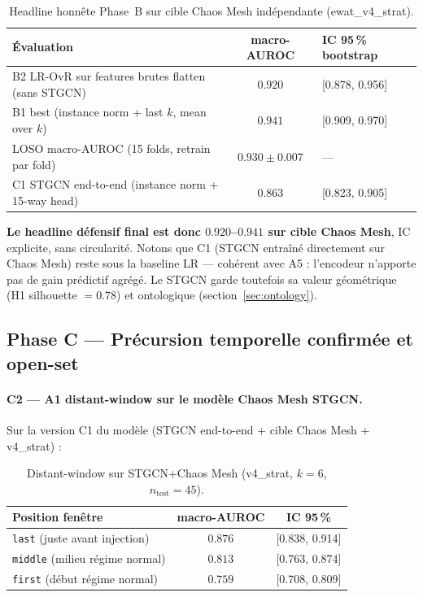 \begin{table}[h]
\centering
\caption{Headline honnête Phase~B sur cible Chaos Mesh indépendante (ewat\_v4\_strat).}
\label{tab:archv2_headline}
\begin{tabular}{lcl}
\toprule
\textbf{Évaluation} & \textbf{macro-AUROC} & \textbf{IC 95\,\% bootstrap} \\
\midrule
B2 LR-OvR sur features brutes flatten (sans STGCN) & $\mathbf{0.920}$ & [0.878, 0.956] \\
B1 best (instance norm + last $k$, mean over $k$)  & $\mathbf{0.941}$ & [0.909, 0.970] \\
LOSO macro-AUROC (15 folds, retrain par fold)      & $0.930 \pm 0.007$ & --- \\
C1 STGCN end-to-end (instance norm + 15-way head)  & $0.863$ & [0.823, 0.905] \\
\bottomrule
\end{tabular}
\end{table}

\textbf{Le headline défensif final est donc $0.920$--$0.941$ sur cible Chaos Mesh}, IC explicite,
sans circularité. Notons que C1 (STGCN entraîné directement sur Chaos Mesh) reste sous la baseline
LR --- cohérent avec A5 : l'encodeur n'apporte pas de gain prédictif agrégé.
Le STGCN garde toutefois sa valeur géométrique (H1 silhouette $= 0.78$) et
ontologique (section~\ref{sec:ontology}).

\subsection{Phase C --- Précursion temporelle confirmée et open-set}

\paragraph{C2 --- A1 distant-window sur le modèle Chaos Mesh STGCN.}
Sur la version C1 du modèle (STGCN end-to-end + cible Chaos Mesh + v4\_strat) :

\begin{table}[h]
\centering
\caption{Distant-window sur STGCN+Chaos Mesh (v4\_strat, $k=6$, $n_{\text{test}}=45$).}
\label{tab:c2_distant}
\begin{tabular}{lcc}
\toprule
\textbf{Position fenêtre} & \textbf{macro-AUROC} & \textbf{IC 95\,\%} \\
\midrule
\texttt{last} (juste avant injection) & $\mathbf{0.876}$ & [0.838, 0.914] \\
\texttt{middle} (milieu régime normal) & $0.813$ & [0.763, 0.874] \\
\texttt{first} (début régime normal)  & $0.759$ & [0.708, 0.809] \\
\bottomrule
\end{tabular}
\end{table}

